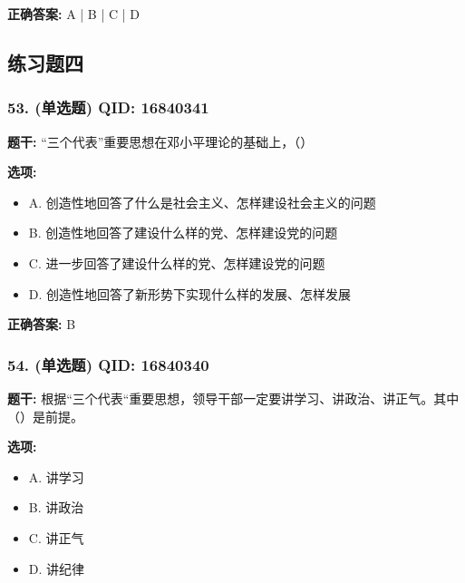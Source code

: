 \documentclass[12pt,UTF8]{ctexart}
\begin{document}
\textbf{正确答案:}
A | B | C | D

\vspace{0.3em}\hrulefill\vspace{0.7em}

\subsection*{练习题四}

\subsubsection*{53. (单选题) \small QID: 16840341}

\textbf{题干:}
“三个代表”重要思想在邓小平理论的基础上，（）

\textbf{选项:}
\begin{itemize}[leftmargin=*]

  \item A. 创造性地回答了什么是社会主义、怎样建设社会主义的问题

  \item B. 创造性地回答了建设什么样的党、怎样建设党的问题

  \item C. 进一步回答了建设什么样的党、怎样建设党的问题

  \item D. 创造性地回答了新形势下实现什么样的发展、怎样发展

\end{itemize}

\textbf{正确答案:}
B

\vspace{0.3em}\hrulefill\vspace{0.7em}

\subsubsection*{54. (单选题) \small QID: 16840340}

\textbf{题干:}
根据“三个代表“重要思想，领导干部一定要讲学习、讲政治、讲正气。其中（）是前提。

\textbf{选项:}
\begin{itemize}[leftmargin=*]

  \item A. 讲学习

  \item B. 讲政治

  \item C. 讲正气

  \item D. 讲纪律

\end{itemize}
\end{document}
